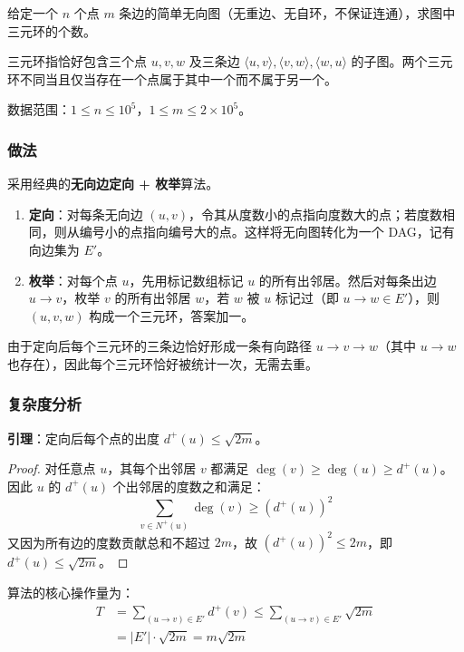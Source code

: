 \documentclass[11pt,a4paper,twocolumn]{ctexart}  %
\begin{document}
给定一个 $n$ 个点 $m$ 条边的简单无向图（无重边、无自环，不保证连通），求图中三元环的个数。

三元环指恰好包含三个点 $u, v, w$ 及三条边 $\langle u,v\rangle, \langle v,w\rangle, \langle w,u\rangle$ 的子图。两个三元环不同当且仅当存在一个点属于其中一个而不属于另一个。

数据范围：$1 \le n \le 10^5$，$1 \le m \le 2 \times 10^5$。

\subsubsection*{做法}

采用经典的\textbf{无向边定向 + 枚举}算法。

\begin{enumerate}
    \item \textbf{定向}：对每条无向边 $(u, v)$，令其从度数小的点指向度数大的点；若度数相同，则从编号小的点指向编号大的点。这样将无向图转化为一个 DAG，记有向边集为 $E'$。
    \item \textbf{枚举}：对每个点 $u$，先用标记数组标记 $u$ 的所有出邻居。然后对每条出边 $u \to v$，枚举 $v$ 的所有出邻居 $w$，若 $w$ 被 $u$ 标记过（即 $u \to w \in E'$），则 $(u, v, w)$ 构成一个三元环，答案加一。
\end{enumerate}

由于定向后每个三元环的三条边恰好形成一条有向路径 $u \to v \to w$（其中 $u \to w$ 也存在），因此每个三元环恰好被统计一次，无需去重。

\subsubsection*{复杂度分析}

\textbf{引理}：定向后每个点的出度 $d^+(u) \le \sqrt{2m}$。

\begin{proof}
对任意点 $u$，其每个出邻居 $v$ 都满足 $\deg(v) \ge \deg(u) \ge d^+(u)$。因此 $u$ 的 $d^+(u)$ 个出邻居的度数之和满足：
\[
    \sum_{v \in N^+(u)} \deg(v) \ge (d^+(u))^2
\]
又因为所有边的度数贡献总和不超过 $2m$，故 $(d^+(u))^2 \le 2m$，即 $d^+(u) \le \sqrt{2m}$。
\end{proof}

算法的核心操作量为：
\[
\begin{aligned}
    T &= \sum_{(u \to v) \in E'} d^+(v) \le \sum_{(u \to v) \in E'} \sqrt{2m} \\
      &= |E'| \cdot \sqrt{2m} = m\sqrt{2m}
\end{aligned}
\]
\end{document}
